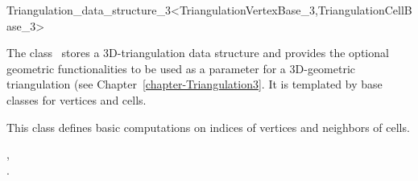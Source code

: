 

\begin{ccRefClass}{Triangulation_data_structure_3<TriangulationVertexBase_3,TriangulationCellBase_3>}  %


\ccDefinition
The class \ccRefName\ stores a 3D-triangulation data structure
and provides the optional
geometric functionalities to be used as a parameter for a 
3D-geometric triangulation (see Chapter~\ref{chapter-Triangulation3}. 
It is templated by base classes for vertices and cells.

\ccIsModel



This class  defines basic computations on
indices of vertices and neighbors of cells. 


\ccSeeAlso

,\\
.




\end{ccRefClass}



